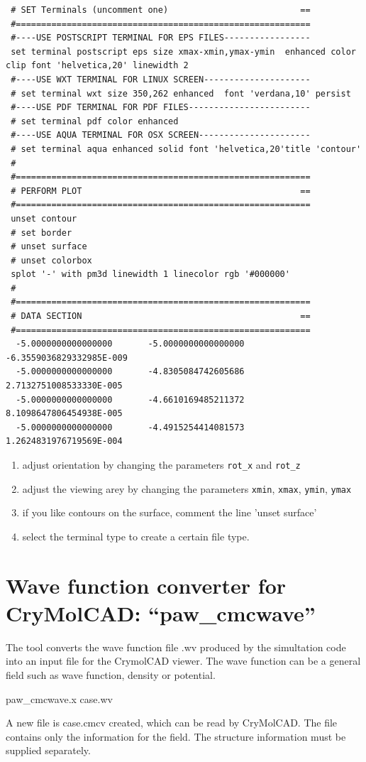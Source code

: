 \documentclass[final,12pt]{article}
\begin{document}
{{{{{\begin{verbatim}
 # SET Terminals (uncomment one)                          ==
 #==========================================================
 #----USE POSTSCRIPT TERMINAL FOR EPS FILES-----------------
 set terminal postscript eps size xmax-xmin,ymax-ymin  enhanced color clip font 'helvetica,20' linewidth 2 
 #----USE WXT TERMINAL FOR LINUX SCREEN---------------------
 # set terminal wxt size 350,262 enhanced  font 'verdana,10' persist 
 #----USE PDF TERMINAL FOR PDF FILES------------------------
 # set terminal pdf color enhanced 
 #----USE AQUA TERMINAL FOR OSX SCREEN----------------------
 # set terminal aqua enhanced solid font 'helvetica,20'title 'contour'
 #
 #==========================================================
 # PERFORM PLOT                                           ==
 #==========================================================
 unset contour
 # set border
 # unset surface
 # unset colorbox
 splot '-' with pm3d linewidth 1 linecolor rgb '#000000'
 #
 #==========================================================
 # DATA SECTION                                           ==
 #==========================================================
  -5.0000000000000000       -5.0000000000000000       -6.3559036829332985E-009
  -5.0000000000000000       -4.8305084742605686        2.7132751008533330E-005
  -5.0000000000000000       -4.6610169485211372        8.1098647806454938E-005
  -5.0000000000000000       -4.4915254414081573        1.2624831976719569E-004
\end{verbatim}}

\begin{enumerate}
\item adjust orientation by changing the parameters \verb|rot_x| and
  \verb|rot_z|
\item adjust the viewing arey by changing the parameters \verb|xmin|,
  \verb|xmax|, \verb|ymin|, \verb|ymax|
\item if you like contours on the surface, comment the line 'unset surface'
\item select the terminal type to create a certain file type.
\end{enumerate}



\newpage
\section{Wave function converter for CryMolCAD: ``paw\_cmcwave''}
The tool converts the wave function file .wv produced by the
simultation code into an input file for the CrymolCAD viewer. The wave
function can be a general field such as wave function, density or
potential.
\begin{center}
paw\_cmcwave.x case.wv
\end{center}
A new file is case.cmcv created, which can be read by CryMolCAD. The
file contains only the information for the field. The structure
information must be supplied separately.


}}}}
\end{document}
